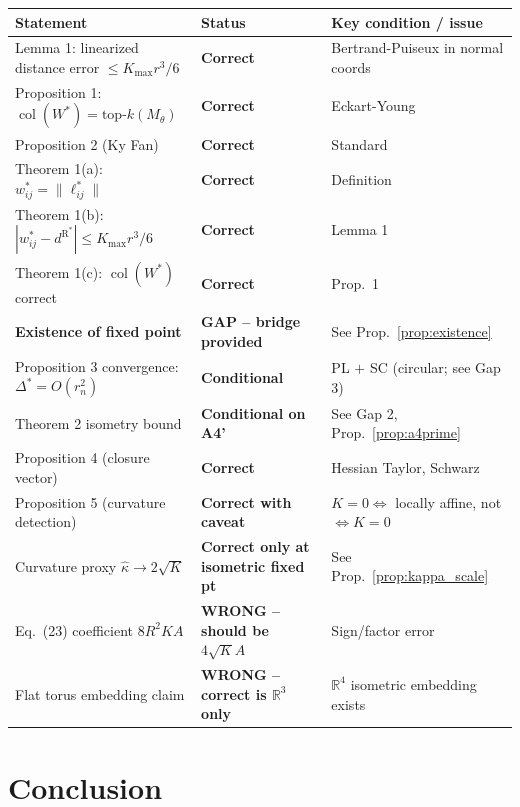 \documentclass[11pt]{article}
\DeclareMathOperator{\col}{col}
\newcommand{\dR}{d^{\mathrm{R}}}
\newcommand{\R}{\mathbb{R}}
\begin{document}
\begin{center}
\begin{tabular}{lll}
\toprule
Statement & Status & Key condition / issue \\
\midrule
Lemma 1: linearized distance error $\le K_{\max}r^3/6$
  & \textbf{Correct} & Bertrand-Puiseux in normal coords \\
Proposition 1: $\col(W^*) = \mathrm{top}$-$k(M_\theta)$
  & \textbf{Correct} & Eckart-Young \\
Proposition 2 (Ky Fan)
  & \textbf{Correct} & Standard \\
Theorem 1(a): $w^*_{ij} = \|\ell^*_{ij}\|$
  & \textbf{Correct} & Definition \\
Theorem 1(b): $|w^*_{ij} - \dR^*| \le K_{\max}r^3/6$
  & \textbf{Correct} & Lemma 1 \\
Theorem 1(c): $\col(W^*)$ correct
  & \textbf{Correct} & Prop.\ 1 \\
\textbf{Existence of fixed point}
  & \textbf{GAP -- bridge provided} & See Prop.\ \ref{prop:existence} \\
Proposition 3 convergence: $\Delta^* = O(r_n^2)$
  & \textbf{Conditional} & PL $+$ SC (circular; see Gap 3) \\
Theorem 2 isometry bound
  & \textbf{Conditional on A4'} & See Gap 2, Prop.\ \ref{prop:a4prime} \\
Proposition 4 (closure vector)
  & \textbf{Correct} & Hessian Taylor, Schwarz \\
Proposition 5 (curvature detection)
  & \textbf{Correct with caveat} & $K=0 \Leftrightarrow$ locally affine, not $\Leftrightarrow K = 0$ \\
Curvature proxy $\hat\kappa \to 2\sqrt{K}$
  & \textbf{Correct only at isometric fixed pt} & See Prop.\ \ref{prop:kappa_scale} \\
Eq.\ (23) coefficient $8R^2KA$
  & \textbf{WRONG -- should be $4\sqrt{K}A$} & Sign/factor error \\
Flat torus embedding claim
  & \textbf{WRONG -- correct is $\R^3$ only} & $\R^4$ isometric embedding exists \\
\bottomrule
\end{tabular}
\end{center}

\section{Conclusion}
\end{document}
